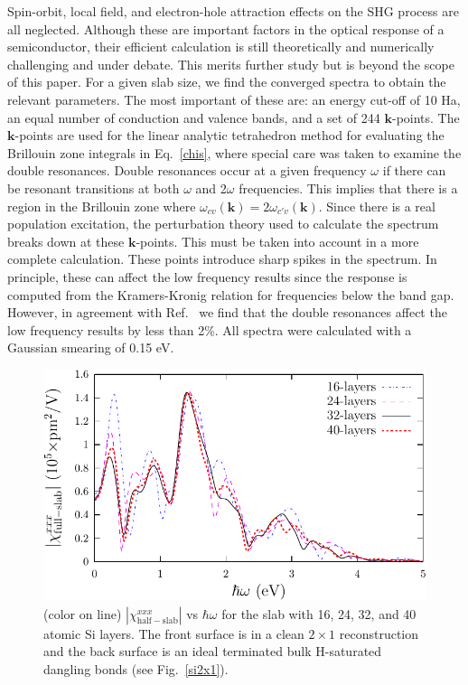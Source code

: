 \documentclass[floatfix,prb,aps,superscriptaddress,showpacs,letterpaper]{revtex4}
\begin{document}
Spin-orbit, local field, and electron-hole 
attraction\cite{beyond}
effects on the SHG process are all neglected.
Although these are important factors in the optical response of a semiconductor,
their efficient calculation is still theoretically and  
numerically challenging and  
under debate. This merits further study but is beyond the scope of this paper.
For a given slab size, we find the converged spectra 
to obtain the relevant parameters. The most important of 
these are: an energy cut-off of 10 Ha, an equal number of conduction and 
valence bands, and a set of 244 $\mathbf{k}$-points.
The $\mathbf{k}$-points are used for the linear analytic 
tetrahedron method for evaluating the
Brillouin zone integrals in Eq.~\eqref{chis}, 
where special care was taken to examine the double resonances.\cite{nastosPRB05}
Double resonances occur at a given frequency $\omega$ if there can be 
resonant transitions at both $\omega$ and 2$\omega$ frequencies. This 
implies that there is a region in the Brillouin zone where 
$\omega_{cv}(\mathbf{k})=2 \omega_{c'v}(\mathbf{k})$. Since there is a real population 
excitation, the perturbation theory used to calculate the spectrum breaks 
down at these $\mathbf{k}$-points. This must be taken into account in a more 
complete calculation. These points introduce sharp spikes in the spectrum. 
In principle, these can affect the low frequency results since the response 
is computed from the Kramers-Kronig relation for frequencies below the band 
gap. However, in agreement with Ref.~ we find that 
the double resonances affect the low frequency results by less than 2\%. 
All spectra were calculated with a Gaussian smearing of 0.15 eV.
\begin{figure}
\centering 
\includegraphics[scale=.8]{plots/fig1}
\caption{(color on line) 
$|\chi_{\mathrm{half-slab}}^{xxx}|$ vs $\hbar\omega$ 
for the slab
with 16, 24, 32, and 40 atomic Si layers. The front surface 
is in a clean $2\times 1$ reconstruction and the back 
surface is an ideal terminated bulk H-saturated dangling bonds (see Fig.~\ref{si2x1}).
\label{fig1}} 
\end{figure}
\end{document}
